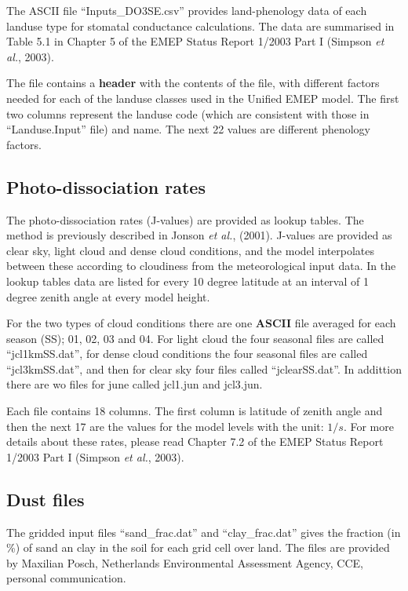 The  ASCII file ``Inputs\_DO3SE.csv'' provides land-phenology data
of each landuse type for stomatal conductance calculations. The 
data are summarised in Table 5.1 in Chapter 5 of the EMEP 
Status Report 1/2003 Part I (Simpson {\sl et al.}, 2003).

The file contains a {\bf header} with the contents of the file,
with different factors needed for each of the landuse classes used
in the Unified EMEP model. The first two columns represent the
landuse code (which are consistent with those in ``Landuse.Input'' file)
and name. The next 22 values are different phenology factors.


\subsection{Photo-dissociation rates}
The photo-dissociation rates (J-values) are provided as lookup
tables. The method is previously described in Jonson {\sl et
al.}, (2001). J-values are provided as clear sky, light cloud and dense
cloud conditions, and the model interpolates between these according
to cloudiness from the meteorological input data. In the lookup tables
data are listed for every 10 degree latitude at an interval of 1
degree zenith angle at every model height.

For the two types of cloud conditions there are one {\bf ASCII} file 
averaged for each season (SS); 01, 02, 03 and 04. 
For light cloud the four seasonal files are called ``jcl1kmSS.dat'', for dense cloud conditions
the four seasonal files are called ``jcl3kmSS.dat'', and then for clear sky four files 
called ``jclearSS.dat''. In addittion there are wo files for june called jcl1.jun 
and jcl3.jun.

Each file contains 18 columns. The first column is latitude of zenith 
angle and then the
next 17 are the values for the model levels with the unit: $1/s$. 
For more details about these rates, please read Chapter 7.2 of the EMEP
Status Report 1/2003 Part I (Simpson {\sl et al.}, 2003).

\subsection{Dust files}

The gridded input files ``sand\_frac.dat'' and ``clay\_frac.dat'' gives the fraction (in \%)  
of sand an clay in the soil for each grid cell over land. The files are provided by 
Maxilian Posch, Netherlands Environmental Assessment Agency, CCE, personal communication.


